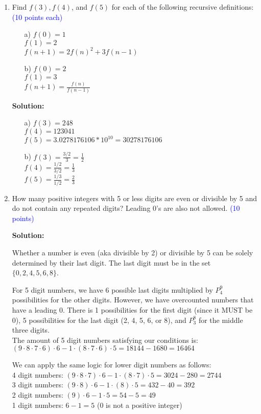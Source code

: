 \documentclass{article}
\newcommand{\pt}[1]{\textcolor{blue}{(#1 points)}}
\newcommand{\pte}[1]{\textcolor{blue}{(#1 points each)}}
\newenvironment{solution}
{
\par
\color{blue}
\textbf{Solution:}
}
{
\par
}
\begin{document}
\begin{enumerate}
\item Find $f(3), f(4)$, and $f(5)$ for each of the following recursive definitions: \pte{10}
\begin{enumerate}
    \item[a)] $f(0) = 1$\\
    $f(1) = 2$\\
    $f(n + 1) = {2f(n)}^2 + 3f(n - 1)$
    \item[b)] $f(0) = 2$\\
    $f(1) = 3$\\
    $f(n+1) = \frac{f(n)}{f(n-1)}$
\end{enumerate}

\begin{solution}
    \begin{enumerate}
        \item[a)] $f(3) = 248$ \\
        $f(4) = 123041$ \\
        $f(5) = 3.0278176106 * 10^{10} = 30278176106$
        \item[b)] $f(3) = \frac{3/2}{3} = \frac{1}{2}$ \\
        $f(4) = \frac{1/2}{3/2} = \frac{1}{3}$ \\
        $f(5) = \frac{1/3}{1/2} = \frac{2}{3}$
    \end{enumerate}
\end{solution}

\item How many positive integers with 5 or less digits are even or divisible by 5 and do not contain any repeated digits?  Leading 0's are also not allowed. \pt{10}
\begin{solution}

Whether a number is even (aka divisible by 2) or divisible by 5 can be solely determined by their last digit. The last digit must be in the set $\{0, 2, 4, 5, 6, 8\}$.

For 5 digit numbers, we have 6 possible last digits multiplied by $P^9_4$ possibilities for the other digits. However, we have overcounted numbers that have a leading 0. There is 1 possibilities for the first digit (since it MUST be 0), 5 possibilities for the last digit (2, 4, 5, 6, or 8), and $P^8_3$ for the middle three digits.\\
The amount of 5 digit numbers satisfying our conditions is: $(9 \cdot 8 \cdot 7 \cdot 6) \cdot 6 - 1 \cdot (8 \cdot 7 \cdot 6) \cdot 5 = 18144 - 1680 = 16464$

We can apply the same logic for lower digit numbers as follows:\\
4 digit numbers: $(9 \cdot 8 \cdot 7) \cdot 6 - 1 \cdot (8 \cdot 7) \cdot 5 = 3024 - 280 = 2744$\\
3 digit numbers: $(9 \cdot 8) \cdot 6 - 1 \cdot (8) \cdot 5 = 432 - 40 = 392$\\
2 digit numbers: $(9) \cdot 6 - 1 \cdot 5 = 54 - 5 = 49$\\
1 digit numbers: $6 - 1 = 5$ (0 is not a positive integer)


\end{solution}
\end{enumerate}
\end{document}
